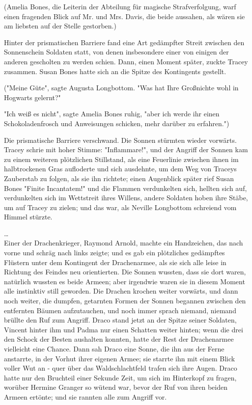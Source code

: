 {(Amelia Bones, die Leiterin der Abteilung für magische Strafverfolgung, warf einen fragenden Blick auf Mr. und Mrs. Davis, die beide aussahen, als wären sie am liebsten auf der Stelle gestorben.)

Hinter der prismatischen Barriere fand eine Art gedämpfter Streit zwischen den Sonnenschein Soldaten statt, von denen insbesondere einer von einigen der anderen gescholten zu werden schien. Dann, einen Moment später, zuckte Tracey zusammen. Susan Bones hatte sich an die Spitze des Kontingents gestellt.

("Meine Güte", sagte Augusta Longbottom. "Was hat Ihre Großnichte wohl in Hogwarts gelernt?"

"Ich weiß es nicht", sagte Amelia Bones ruhig, "aber ich werde ihr einen Schokoladenfrosch und Anweisungen schicken, mehr darüber zu erfahren.")

Die prismatische Barriere verschwand. Die Sonnen stürmten wieder vorwärts. Tracey schrie mit hoher Stimme: "Inflammare!", und der Angriff der Sonnen kam zu einem weiteren plötzlichen Stillstand, als eine Feuerlinie zwischen ihnen im halbtrockenen Gras aufloderte und sich ausdehnte, um dem Weg von Traceys Zauberstab zu folgen, als sie ihn richtete; einen Augenblick später rief Susan Bones "Finite Incantatem!" und die Flammen verdunkelten sich, hellten sich auf, verdunkelten sich im Wettstreit ihres Willens, andere Soldaten hoben ihre Stäbe, um auf Tracey zu zielen; und das war, als Neville Longbottom schreiend vom Himmel stürzte.

…\\ Einer der Drachenkrieger, Raymond Arnold, machte ein Handzeichen, das nach vorne und schräg nach links zeigte; und es gab ein plötzliches gedämpftes Flüstern unter dem Kontingent der Drachenarmee, als sie sich alle leise in Richtung des Feindes neu orientierten. Die Sonnen wussten, dass sie dort waren, natürlich wussten es beide Armeen; aber irgendwie waren sie in diesem Moment alle instinktiv still geworden. Die Drachen krochen weiter vorwärts, und dann noch weiter, die dumpfen, getarnten Formen der Sonnen begannen zwischen den entfernten Bäumen aufzutauchen, und noch immer sprach niemand, niemand brüllte den Ruf zum Angriff. Draco stand jetzt an der Spitze seiner Soldaten, Vincent hinter ihm und Padma nur einen Schatten weiter hinten; wenn die drei den Schock der Besten aushalten konnten, hatte der Rest der Drachenarmee vielleicht eine Chance. Dann sah Draco eine Sonne, die ihn aus der Ferne anstarrte, in der Vorhut ihrer eigenen Armee; sie starrte ihn mit einem Blick voller Wut an - quer über das Waldschlachtfeld trafen sich ihre Augen. Draco hatte nur den Bruchteil einer Sekunde Zeit, um sich im Hinterkopf zu fragen, worüber Hermine Granger so wütend war, bevor der Ruf von ihren beiden Armeen ertönte; und sie rannten alle zum Angriff vor.

}
